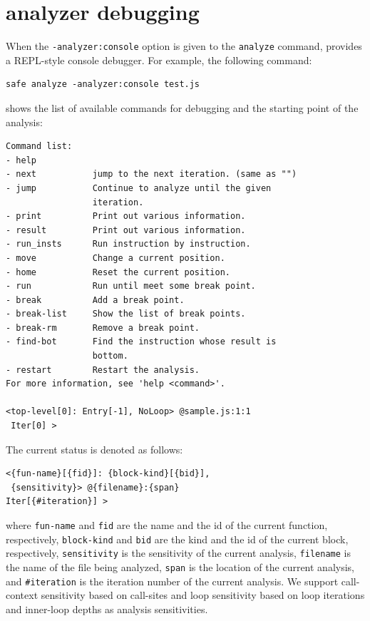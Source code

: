 \section{\safe analyzer debugging}
When the \verb!-analyzer:console! option is given to the \texttt{analyze} command,
\safe provides a REPL-style console debugger.
For example, the following command:
\begin{verbatim}
safe analyze -analyzer:console test.js
\end{verbatim}
shows the list of available commands for debugging and
the starting point of the analysis:
{\small
\begin{verbatim}
Command list:
- help
- next           jump to the next iteration. (same as "")
- jump           Continue to analyze until the given
                 iteration.
- print          Print out various information.
- result         Print out various information.
- run_insts      Run instruction by instruction.
- move           Change a current position.
- home           Reset the current position.
- run            Run until meet some break point.
- break          Add a break point.
- break-list     Show the list of break points.
- break-rm       Remove a break point.
- find-bot       Find the instruction whose result is
                 bottom.
- restart        Restart the analysis.
For more information, see 'help <command>'.

<top-level[0]: Entry[-1], NoLoop> @sample.js:1:1
 Iter[0] >
\end{verbatim}
}

The current status is denoted as follows:
{\small
\begin{verbatim}
<{fun-name}[{fid}]: {block-kind}[{bid}],
 {sensitivity}> @{filename}:{span}
Iter[{#iteration}] >
\end{verbatim}
}
\noindent
where \verb!fun-name! and \verb!fid! are the name and the id of the current function,
respectively, \verb!block-kind! and \verb!bid!
are the kind and the id of the current block, respectively,
\verb!sensitivity! is the sensitivity of the current analysis,
\verb!filename! is the name of the file being analyzed,
\verb!span! is the location of the current analysis, and
\verb!#iteration! is the iteration number of the current analysis.
We support call-context sensitivity based on call-sites
and loop sensitivity based on loop iterations and inner-loop depths
as analysis sensitivities.

